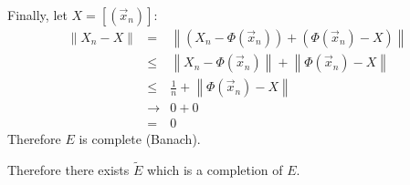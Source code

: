 \documentclass[letterpaper,12pt,fleqn]{article}
\newcommand{\Et}{\tilde{E}}
\renewcommand{\o}{\Phi}
\newcommand{\vx}{\vec{x}}
\newcommand{\norm}[1]{\left\|#1\right\|}
\begin{document}
\begin{theproof}
  Finally, let $X=[(\vx_n)]$:
  \begin{eqnarray*}
    \norm{X_n-X} &=& \norm{(X_n-\o(\vx_n))+(\o(\vx_n)-X)} \\
    &\le& \norm{X_n-\o(\vx_n)}+\norm{\o(\vx_n)-X} \\
    &\le& \frac{1}{n}+\norm{\o(\vx_n)-X} \\
    &\to& 0+0 \\
    &=& 0
  \end{eqnarray*}
  Therefore $E$ is complete (Banach).

  Therefore there exists $\Et$ which is a completion of $E$.
\end{theproof}
\end{document}
